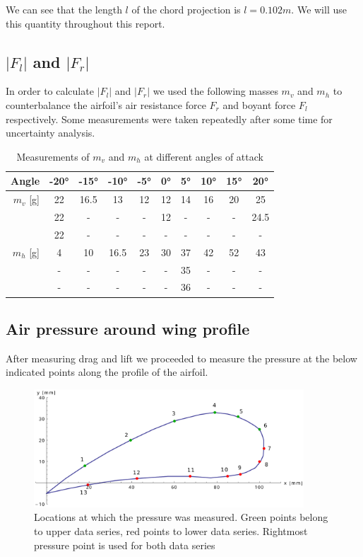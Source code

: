 \documentclass{scrreprt}
\begin{document}
We can see that the length $l$ of the chord projection is $l=0.102m$. We will use this quantity throughout this report.

\subsection{\boldmath$\lvert F_l\rvert$ and \boldmath$\lvert F_r\rvert$}
In order to calculate $\lvert F_l\rvert$ and $\lvert F_r\rvert$ we used the following masses $m_v$ and $m_h$ to counterbalance the airfoil's air resistance force $F_r$ and boyant force $F_l$ respectively. Some measurements were taken repeatedly after some time for uncertainty analysis.

\begin{table}[H]
\center
\begin{tabular}{|r|c|c|c|c|c|c|c|c|c|}
\hline
Angle & \ang{-20} & \ang{-15} & \ang{-10} & \ang{-5} & \ang{0} & \ang{5} & \ang{10} & \ang{15} & \ang{20}\\
\hline\hline
$m_v$ [g] & 22 & 16.5 & 13 & 12 & 12 & 14 & 16 & 20 & 25\\ 
          & 22 &   -   &  -  &  -  & 12 &  -  &  -  &  -  & 24.5\\ 
          & 22 &   -   &  -  &  -  &  -  & -   & -   &  -  & -\\  
\hline\hline
$m_h$ [g] & 4 & 10 & 16.5 & 23 & 30 & 37 & 42 & 52 & 43\\
& - & - & - & - & - & 35 & - & - & -\\
& - & - & - & - & - & 36 & - & - & -\\
\hline
\end{tabular}
\caption{Measurements of $m_v$ and $m_h$ at different angles of attack}
\label{tab:polarmes}
\end{table}

\subsection{Air pressure around wing profile}
After measuring drag and lift we proceeded to measure the pressure at the below indicated points along the profile of the airfoil.
\begin{figure}[H]
	\centering
  \includegraphics[width=0.9\textwidth]{diag/pressure_points.pdf}
	\caption{Locations at which the pressure was measured. Green points belong to upper data series, red points to lower data series. Rightmost pressure point is used for both data series}
	\label{fig:prespoints}
\end{figure}
\end{document}
